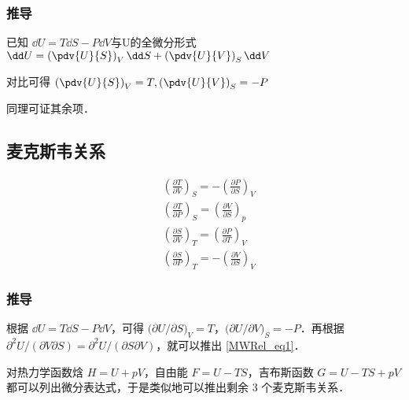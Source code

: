 \subsubsection{推导}
已知 $\dd U = T \dd S - P \dd V$与U的全微分形式 $\dd U = \left(\pdv{U}{S}\right)_V \dd S+\left(\pdv{U}{V}\right)_S \dd V$

对比可得 $\left(\pdv{U}{S}\right)_V=T, \left(\pdv{U}{V}\right)_S=-P$

同理可证其余项．

\subsection{麦克斯韦关系}

\begin{align}
&\left(\frac{\partial T}{\partial V}\right)_S=-\left(\frac{\partial P}{\partial S}\right)_V\label{MWRel_eq1}
\\
&\left(\frac{\partial T}{\partial P}\right)_S=\left(\frac{\partial V}{\partial S}\right)_p
\\
&\left(\frac{\partial S}{\partial V}\right)_T=\left(\frac{\partial P}{\partial T}\right)_V
\\
&\left(\frac{\partial S}{\partial P}\right)_T=-\left(\frac{\partial V}{\partial S}\right)_V
\end{align}

\subsubsection{推导}
根据 $\dd U=T\dd S-P\dd V$，可得 $\Big(\partial U/\partial S\Big)_V=T$，$\Big(\partial U/\partial V\Big)_S=-P$．再根据 $\partial^2 U/(\partial V\partial S)=\partial^2 U/(\partial S\partial V)$，就可以推出 \autoref{MWRel_eq1}．

对热力学函数焓 $H=U+pV$，自由能 $F=U-TS$，吉布斯函数 $G=U-TS+pV$ 都可以列出微分表达式，于是类似地可以推出剩余 $3$ 个麦克斯韦关系．

